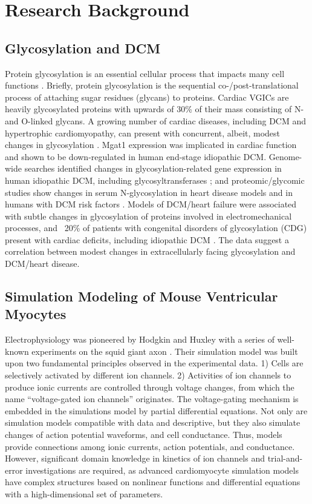 \documentclass[journal]{IEEEtran}
\begin{document}
\section{Research Background}
\subsection{Glycosylation and DCM}
Protein glycosylation is an essential cellular process that impacts many cell functions \cite{marques2017cardiac}. Briefly, protein glycosylation is the sequential co-/post-translational process of attaching sugar residues (glycans) to proteins. Cardiac VGICs are heavily glycosylated proteins with upwards of 30\% of their mass consisting of N- and O-linked glycans. A growing number of cardiac diseases, including DCM and hypertrophic cardiomyopathy, can present with concurrent, albeit, modest changes in glycosylation \cite{gehrmann2003cardiomyopathy, footitt2009cardiomyopathy, marques2017cardiac}. Mgat1 expression was implicated in cardiac function and shown to be down-regulated in human end-stage idiopathic DCM. Genome-wide searches identified changes in glycosylation-related gene expression in human idiopathic DCM, including glycosyltransferases \cite{barrans2002global, hwang2002microarray, yung2004gene}; and proteomic/glycomic studies show changes in serum N-glycosylation in heart disease models and in humans with DCM risk factors \cite{nishio1995identification, knezevic2009variability, miura2016glycomics, nagai2016aberrant, yang2015glycoproteins}. Models of DCM/heart failure were associated with subtle changes in glycosylation of proteins involved in electromechanical processes, and ~20\% of patients with congenital disorders of glycosylation (CDG) present with cardiac deficits, including idiopathic DCM \cite{gehrmann2003cardiomyopathy, marques2017cardiac}. The data suggest a correlation between modest changes in extracellularly facing glycosylation and DCM/heart disease. 

\subsection{Simulation Modeling of Mouse Ventricular Myocytes}
Electrophysiology was pioneered by Hodgkin and Huxley with a series of well-known experiments on the squid giant axon \cite{hodgkin1952quantitative}. Their simulation model was built upon two fundamental principles observed in the experimental data. 1) Cells are selectively activated by different ion channels. 2) Activities of ion channels to produce ionic currents are controlled through voltage changes, from which the name ``voltage-gated ion channels'' originates. The voltage-gating mechanism is embedded in the simulations model by partial differential equations. Not only are simulation models compatible with data and descriptive, but they also simulate changes of action potential waveforms, and cell conductance. Thus, models provide connections among ionic currents, action potentials, and conductance. However, significant domain knowledge in kinetics of ion channels and trial-and-error investigations are required, as advanced cardiomyocyte simulation models have complex structures based on nonlinear functions and differential equations with a high-dimensional set of parameters.
\end{document}
